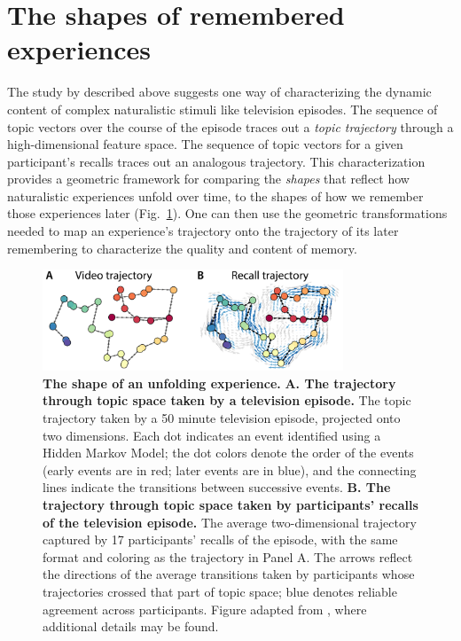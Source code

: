 \documentclass{article}
\begin{document}
\section*{The shapes of remembered experiences}
The study by \cite{HeusEtal18c} described above suggests one way of characterizing the dynamic content of complex naturalistic stimuli like television episodes.  The sequence of topic vectors over the course of the episode traces out a \textit{topic trajectory} through a high-dimensional feature space.  The sequence of topic vectors for a given participant's recalls traces out an analogous trajectory.  This characterization provides a geometric framework for comparing the \textit{shapes} that reflect how naturalistic experiences unfold over time, to the shapes of how we remember those experiences later (Fig.~\ref{fig:trajectories}).  One can then use the geometric transformations needed to map an experience's trajectory onto the trajectory of its later remembering to characterize the quality and content of memory.

\begin{figure}[tp]
\centering
\includegraphics[width=0.8\textwidth]{figs/trajectory}
\caption{\textbf{The shape of an unfolding experience.}  \textbf{A. The trajectory through topic space taken by a television episode.} The topic trajectory taken by a 50 minute television episode, projected onto two dimensions.  Each dot indicates an event identified using a Hidden Markov Model; the dot colors denote the order of the events (early events are in red; later events are in blue), and the connecting lines indicate the transitions between successive events.  \textbf{B. The trajectory through topic space taken by participants' recalls of the television episode.} The average two-dimensional trajectory captured by 17 participants' recalls of the episode, with the same format and coloring as the trajectory in Panel A. The arrows reflect the directions of the average transitions taken by participants whose trajectories crossed that part of topic space; blue denotes reliable agreement across participants.  Figure adapted from \cite{HeusEtal18c}, where additional details may be found.}
\label{fig:trajectories}
\end{figure}
\end{document}
